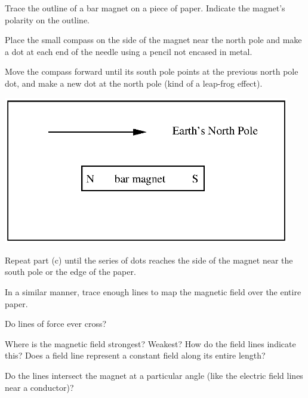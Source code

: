\begin{enumerate}[labparts]
\begin{minipage}{0.5\textwidth}
\item Trace the outline of a bar magnet on a piece of paper.
 Indicate the magnet's polarity on the outline.
\item Place the small compass on the side of the magnet near the north pole
 and make a dot at each end of the needle using a pencil not encased in metal.
\item Move the compass forward until its south pole points at the previous
north pole dot, and make a new dot at the north pole (kind of a leap-frog 
effect).
\end{minipage}
\begin{minipage}{0.49\textwidth}
\hspace{0.05\textwidth}
\includegraphics[trim={0 0 3.5mm 0},clip,width=0.94\textwidth]{magnetism_field_perm_mag/magnetism_2_fig_1.eps}
\end{minipage}


\item Repeat part (c) until the series of dots reaches the side of the magnet near 
the south pole or the edge of the paper.
\item In a similar manner, trace enough lines to map the magnetic field
over the entire paper.
\item Do lines of force ever cross?
\answerspace{15mm}

\item Where is the magnetic field strongest? Weakest? How do the field
lines indicate this? Does a field line represent a constant field
along its entire length?
\answerspace{15mm}

\item Do the lines intersect the magnet at a particular angle (like the
electric field lines near a conductor)?
\answerspace{15mm}
\end{enumerate}

